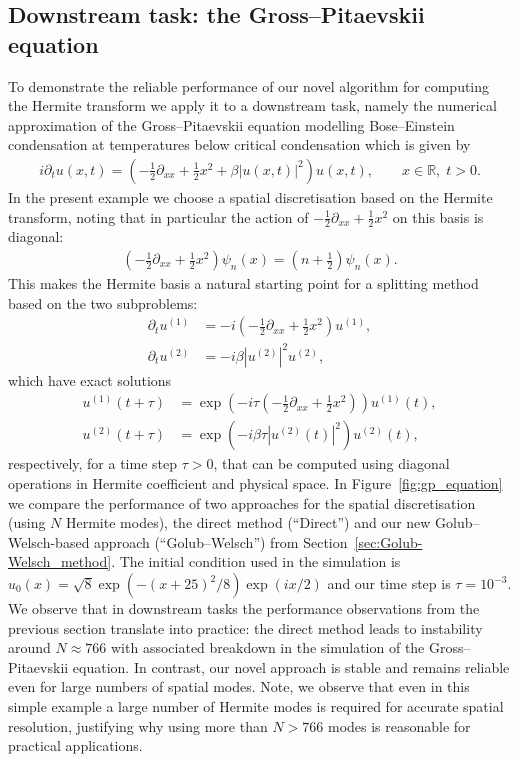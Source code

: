 \documentclass[10pt]{article}
\numberwithin{theorem}{section}
\begin{document}
\subsection{Downstream task: the Gross--Pitaevskii equation}\label{sec:downstream}
To demonstrate the reliable performance of our novel algorithm for computing the Hermite transform we apply it to a downstream task, namely the numerical approximation of the Gross--Pitaevskii equation modelling Bose--Einstein condensation at temperatures below critical condensation \cite{bao2003numerical,gross1961structure,pitaevskii1961vortex} which is given by
\begin{align}\label{eqn:Gross-Pitaevskii_equation}
i \partial_t u(x,t)
=
\left(
-\frac{1}{2}\partial_{xx}
+\frac{1}{2}x^2
+\beta |u(x,t)|^2
\right)u(x,t),
\qquad x\in\mathbb{R}, \; t>0.
\end{align}
In the present example we choose a spatial discretisation based on the Hermite transform, noting that in particular the action of $-\frac{1}{2}\partial_{xx}
+\frac{1}{2}x^2$ on this basis is diagonal:
\begin{align*}
    \left(-\frac{1}{2}\partial_{xx}+\frac{1}{2}x^2\right)\psi_n(x)
    = \left(n+\frac{1}{2}\right)\psi_n(x).
\end{align*}
This makes the Hermite basis a natural starting point for a splitting method based on the two subproblems:
\begin{align*}%
    \partial_t u^{(1)} &= -i\left(-\tfrac12\partial_{xx}+\tfrac12 x^2\right)u^{(1)}, \\%
    \partial_t u^{(2)} &= -i\beta |u^{(2)}|^2u^{(2)},
\end{align*}
which have exact solutions
\begin{align}\label{eqn:exact_sln1}
    u^{(1)}(t+\tau)
    &= \exp\!\left(-i\tau\left(-\tfrac12\partial_{xx}+\tfrac12 x^2\right)\right)u^{(1)}(t), \\\label{eqn:exact_sln2}
    u^{(2)}(t+\tau)
    &= \exp\!\left(-i\beta\tau |u^{(2)}(t)|^2\right)u^{(2)}(t),
\end{align}
respectively, for a time step $\tau>0$, that can be computed using diagonal operations in Hermite coefficient and physical space. In Figure~\ref{fig:gp_equation} we compare the performance of two approaches for the spatial discretisation (using $N$ Hermite modes), the direct method (``Direct'') and our new Golub--Welsch-based approach (``Golub--Welsch'') from Section~\ref{sec:Golub-Welsch_method}. The initial condition used in the simulation is $u_0(x)=\sqrt{8}\exp(-(x+25)^2/8)\exp(ix/2)$ and our time step is $\tau=10^{-3}$. We observe that in downstream tasks the performance observations from the previous section translate into practice: the direct method leads to instability {around $N\approx 766$ with associated breakdown in the simulation of the Gross--Pitaevskii equation}. In contrast, our novel approach is stable and remains reliable even for large numbers of spatial modes. Note, we observe that even in this simple example a large number of Hermite modes is required for accurate spatial resolution, justifying why using more than $N>766$ modes is reasonable for practical applications.
\end{document}
